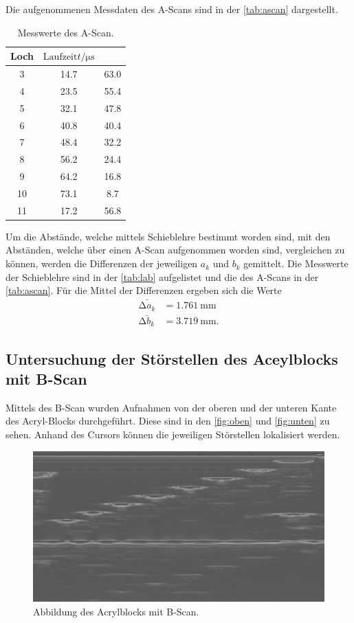 Die aufgenommenen Messdaten des A-Scans sind in der \autoref{tab:ascan} dargestellt.
\begin{table}[H]
    \centering
    \caption{Messwerte des A-Scan.}
    \label{tab:ascan}
\begin{tabular}{c c c}
    \toprule
    Loch & $\text{Laufzeit} t / \si{\micro\second} $\\
    \midrule
     3 & 14.7 & 63.0 \\
     4 & 23.5 & 55.4 \\
     5 & 32.1 & 47.8 \\
     6 & 40.8 & 40.4 \\
     7 & 48.4 & 32.2 \\
     8 & 56.2 & 24.4 \\
     9 & 64.2 & 16.8 \\
    10 & 73.1 &  8.7 \\
    11 & 17.2 & 56.8 \\
    \bottomrule
\end{tabular}
\end{table}

Um die Abstände, welche mittels Schieblehre bestimmt worden sind, mit den Abständen, welche über einen A-Scan aufgenommen worden sind,
vergleichen zu können, werden die Differenzen der jeweiligen $a_k$ und $b_k$ gemittelt.
Die Messwerte der Schieblehre sind in der \autoref{tab:lab} aufgelistet und die des A-Scans in der \autoref{tab:ascan}.
Für die Mittel der Differenzen ergeben sich die Werte
\begin{align*}
\bar{\increment a_k} &= \SI{1.761}{\milli\meter} \\
\bar{\increment b_k} &= \SI{3.719}{\milli\meter}.
\end{align*}

\subsection{Untersuchung der Störstellen des Aceylblocks mit B-Scan}
\label{Untersuchung der Störstellen des Aceylblocks mit B-Scan}

Mittels des B-Scan wurden Aufnahmen von der oberen und der unteren Kante des Acryl-Blocks durchgeführt.
Diese sind in den \autoref{fig:oben} und \autoref{fig:unten} zu sehen. Anhand des Cursors können die jeweiligen Störstellen 
lokalisiert werden.

\begin{figure}[H]
    \centering
	\includegraphics[width=0.8\linewidth]{data/US1_daten/b_scan_oben.jpg}
    \captionsetup{width=0.765\linewidth}
	\caption{Abbildung des Acrylblocks mit B-Scan.}
	\label{fig:oben}
\end{figure}

